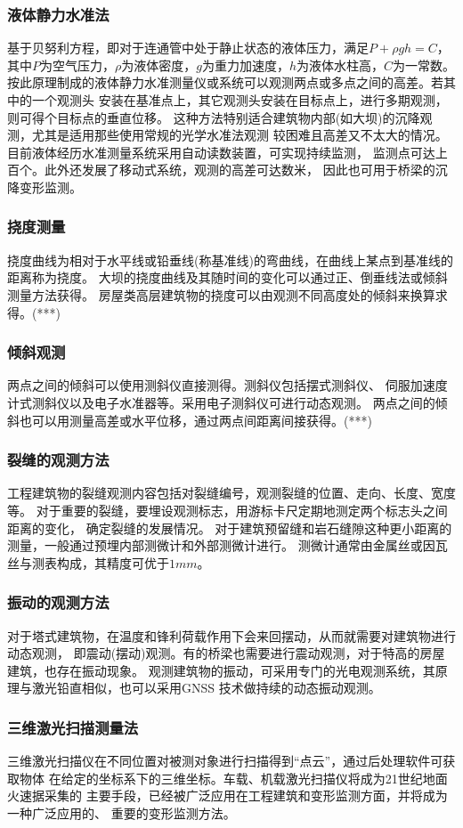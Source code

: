 \subsubsection*{液体静力水准法}
基于贝努利方程，即对于连通管中处于静止状态的液体压力，满足$P+{\rho}gh=C$，
其中$P$为空气压力，$\rho$为液体密度，$g$为重力加速度，$h$为液体水柱高，$C$为一常数。
按此原理制成的液体静力水准测量仪或系统可以观测两点或多点之间的高差。若其中的一个观测头
安装在基准点上，其它观测头安装在目标点上，进行多期观测，则可得个目标点的垂直位移。
这种方法特别适合建筑物内部(如大坝)的沉降观测，尤其是适用那些使用常规的光学水准法观测
较困难且高差又不太大的情况。目前液体经历水准测量系统采用自动读数装置，可实现持续监测，
监测点可达上百个。此外还发展了移动式系统，观测的高差可达数米，
因此也可用于桥梁的沉降变形监测。
\subsubsection*{挠度测量}
挠度曲线为相对于水平线或铅垂线(称基准线)的弯曲线，在曲线上某点到基准线的距离称为挠度。
大坝的挠度曲线及其随时间的变化可以通过正、倒垂线法或倾斜测量方法获得。
房屋类高层建筑物的挠度可以由观测不同高度处的倾斜来换算求得。(***)
\subsubsection*{倾斜观测}
两点之间的倾斜可以使用测斜仪直接测得。测斜仪包括摆式测斜仪、
伺服加速度计式测斜仪以及电子水准器等。采用电子测斜仪可进行动态观测。
两点之间的倾斜也可以用测量高差或水平位移，通过两点间距离间接获得。(***)
\subsubsection*{裂缝的观测方法}
工程建筑物的裂缝观测内容包括对裂缝编号，观测裂缝的位置、走向、长度、宽度等。
对于重要的裂缝，要埋设观测标志，用游标卡尺定期地测定两个标志头之间距离的变化，
确定裂缝的发展情况。
对于建筑预留缝和岩石缝隙这种更小距离的测量，一般通过预埋内部测微计和外部测微计进行。
测微计通常由金属丝或因瓦丝与测表构成，其精度可优于$1mm$。
\subsubsection*{振动的观测方法}
对于塔式建筑物，在温度和锋利荷载作用下会来回摆动，从而就需要对建筑物进行动态观测，
即震动(摆动)观测。有的桥梁也需要进行震动观测，对于特高的房屋建筑，也存在振动现象。
观测建筑物的振动，可采用专门的光电观测系统，其原理与激光铅直相似，也可以采用GNSS
技术做持续的动态振动观测。
\subsubsection*{三维激光扫描测量法}
三维激光扫描仪在不同位置对被测对象进行扫描得到“点云”，通过后处理软件可获取物体
在给定的坐标系下的三维坐标。车载、机载激光扫描仪将成为21世纪地面火速据采集的
主要手段，已经被广泛应用在工程建筑和变形监测方面，并将成为一种广泛应用的、
重要的变形监测方法。
